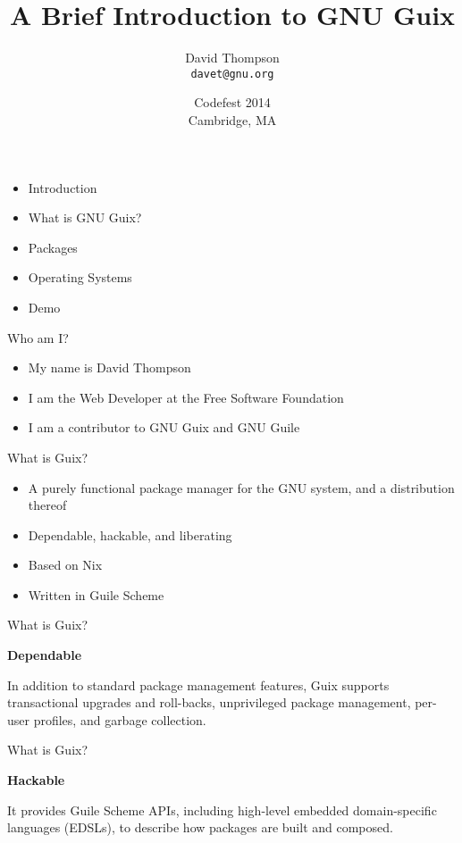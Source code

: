 \documentclass{beamer}
\title[GNU Guix]{A Brief Introduction to GNU Guix}
\author{David Thompson\\\texttt{davet@gnu.org}}
\date{\small{Codefest 2014\\Cambridge, MA}}
\begin{document}
\maketitle

\begin{frame}[plain]
  \begin{itemize}
  \item Introduction
  \item What is GNU Guix?
  \item Packages
  \item Operating Systems
  \item Demo
  \end{itemize}
\end{frame}

\begin{frame}{Who am I?}
  \begin{itemize}
  \item My name is David Thompson
  \item I am the Web Developer at the Free Software Foundation
  \item I am a contributor to GNU Guix and GNU Guile
  \end{itemize}
\end{frame}

\begin{frame}{What is Guix?}
  \begin{itemize}
  \item A purely functional package manager for the GNU
    system, and a distribution thereof
  \item Dependable, hackable, and liberating
  \item Based on Nix
  \item Written in Guile Scheme
  \end{itemize}
\end{frame}

\begin{frame}{What is Guix?}
  \begin{centering}
    \Huge{\textbf{Dependable}}
  \end{centering}

  \vspace{1cm}

  In addition to standard package management features, Guix supports
  transactional upgrades and roll-backs, unprivileged package
  management, per-user profiles, and garbage collection.
\end{frame}

\begin{frame}{What is Guix?}
  \begin{centering}
    \Huge{\textbf{Hackable}}
  \end{centering}

  \vspace{1cm}

  It provides Guile Scheme APIs, including high-level embedded
  domain-specific languages (EDSLs), to describe how packages are
  built and composed.
\end{frame}
\end{document}
